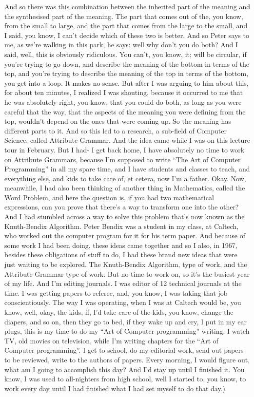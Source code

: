 \documentclass[]{article}
\begin{document}
And so there was this combination between the inherited part of the
meaning and the synthesised part of the meaning. The part that comes out
of the, you know, from the small to large, and the part that comes from
the large to the small, and I said, you know, I can't decide which of
these two is better. And so Peter says to me, as we're walking in this
park, he says: well why don't you do both? And I said, well, this is
obviously ridiculous. You can't, you know, it; will be circular, if
you're trying to go down, and describe the meaning of the bottom in
terms of the top, and you're trying to describe the meaning of the top
in terms of the bottom, you get into a loop. It makes no sense. But
after I was arguing to him about this, for about ten minutes, I realized
I was shouting, because it occurred to me that he was absolutely right,
you know, that you could do both, as long as you were careful that the
way, that the aspects of the meaning you were defining from the top,
wouldn't depend on the ones that were coming up. So the meaning has
different parts to it. And so this led to a research, a sub-field of
Computer Science, called Attribute Grammar. And the idea came while I
was on this lecture tour in February. But I had- I get back home, I have
absolutely no time to work on Attribute Grammars, because I'm supposed
to write ``The Art of Computer Programming'' in all my spare time, and I
have students and classes to teach, and everything else, and kids to
take care of, et cetera, now I'm a father. Okay. Now, meanwhile, I had
also been thinking of another thing in Mathematics, called the Word
Problem, and here the question is, if you had two mathematical
expressions, can you prove that there's a way to transform one into the
other? And I had stumbled across a way to solve this problem that's now
known as the Knuth-Bendix Algorithm. Peter Bendix was a student in my
class, at Caltech, who worked out the computer program for it for his
term paper. And because of some work I had been doing, these ideas came
together and so I also, in 1967, besides these obligations of stuff to
do, I had these brand new ideas that were just waiting to be explored.
The Knuth-Bendix Algorithm, type of work, and the Attribute Grammar type
of work. But no time to work on, so it's the busiest year of my life.
And I'm editing journals. I was editor of 12 technical journals at the
time. I was getting papers to referee, and, you know, I was taking that
job conscientiously. The way I was operating, when I was at Caltech
would be, you know, well, okay, the kids, if, I'd take care of the kids,
you know, change the diapers, and so on, then they go to bed, if they
wake up and cry, I put in my ear plugs, this is my time to do my ``Art
of Computer programming'' writing. I watch TV, old movies on television,
while I'm writing chapters for the ``Art of Computer programming''. I
get to school, do my editorial work, send out papers to be reviewed,
write to the authors of papers. Every morning, I would figure out, what
am I going to accomplish this day? And I'd stay up until I finished it.
You know, I was used to all-nighters from high school, well I started
to, you know, to work every day until I had finished what I had set
myself to do that day.)
\end{document}
